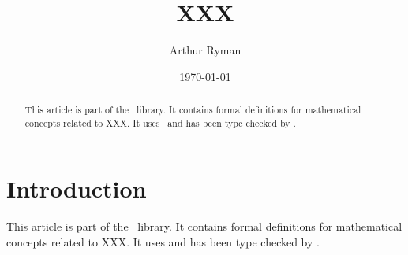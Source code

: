 \documentclass{amsart}
\begin{document}
\title{XXX}
\author{Arthur Ryman}
\date{\today}

\begin{abstract}
    This article is part of the \mathz\ library.
    It contains formal definitions for mathematical concepts related to XXX.
    It uses \ZN\ and has been type checked by \fuzz.
\end{abstract}

\maketitle

\tableofcontents

\section{Introduction}

This article is part of the \mathz\ library.
It contains formal definitions for mathematical concepts related to XXX.
It uses \ZN\cite{spivey-zrm} and has been type checked by \fuzz\cite{spivey-fm}.

\printbibliography
\end{document}
